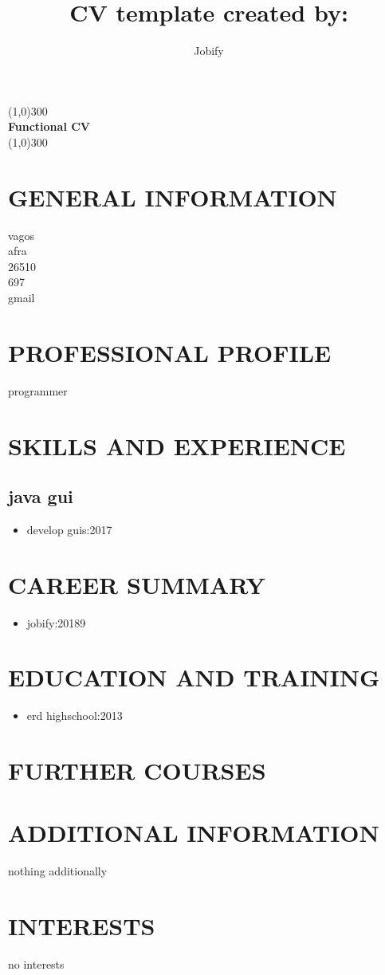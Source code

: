 \documentclass{article}
\title{CV template created by:}
\author{Jobify}
\begin{document}
\maketitle
	\begin{center}
	\line(1,0){300}\\
	[0.25in]
	\huge{\bfseries Functional CV}\\
	[2mm]
	\line(1,0){300}\\
	[1.5cm]
	\end{center}
\section{GENERAL INFORMATION}
vagos\\
afra\\
26510\\
697\\
gmail\\
\section{PROFESSIONAL PROFILE}
programmer\\
\section{SKILLS AND EXPERIENCE}
\subsection{java gui}
\begin{itemize}
\item develop guis:2017
\end{itemize}
\section{CAREER SUMMARY}
\begin{itemize}
\item jobify:20189
\end{itemize}
\section{EDUCATION AND TRAINING}
\begin{itemize}
\item erd highschool:2013
\end{itemize}
\section{FURTHER COURSES}
\section{ADDITIONAL INFORMATION}
nothing additionally\\
\section{INTERESTS}
no interests\\
\end{document}
